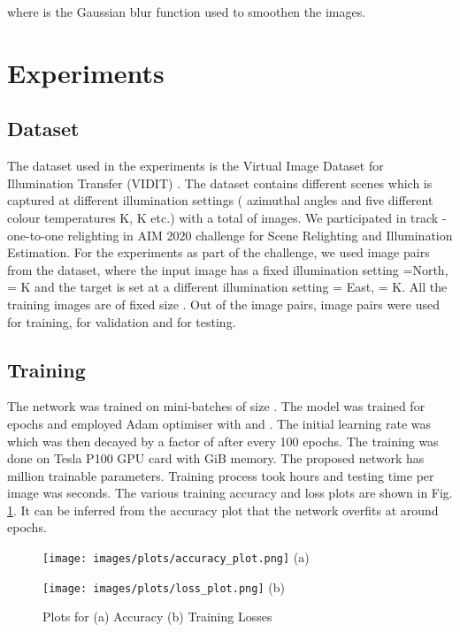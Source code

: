 \documentclass[runningheads]{llncs}
\begin{document}
where  is the Gaussian blur function used to smoothen the images.

\section{Experiments}
\label{section:experiments}
\subsection{Dataset}
The dataset used in the experiments is the Virtual Image Dataset for Illumination Transfer (VIDIT) \cite{vidit}. The dataset contains  different scenes which is captured at  different illumination settings ( azimuthal angles and five different colour temperatures K, K etc.) with a total of  images. We participated in track  - one-to-one relighting in AIM 2020 challenge for Scene Relighting and Illumination Estimation. For the experiments as part of the challenge, we used  image pairs from the dataset, where the input image has a fixed illumination setting =North,  = K and the target is set at a different illumination setting  = East,  = K. All the training images are of fixed size . 
Out of the  image pairs,  image pairs were used for training,  for validation and  for testing. 
\subsection{Training}
\par

The network was trained on mini-batches of size . The model was trained for  epochs and employed Adam optimiser with  and . The initial learning rate was  which was then decayed by a factor of  after every 100 epochs. The training was done on  Tesla P100 GPU card with  GiB memory. The proposed network has  million trainable parameters. Training process took  hours and testing time per image was  seconds. The various training accuracy and loss plots are shown in Fig. \ref{fig:plots}. It can be inferred from the accuracy plot that the network overfits at around  epochs.



\begin{figure}
\centering
\newcommand\x{0.49}
\newcommand\scale{0.34}
  \begin{minipage}{\x\linewidth}
		\begin{center}
		\texttt{[image: images/plots/accuracy\_plot.png]}
		\fontsize{8}{12pt}\selectfont (a)
		\end{center}
  \end{minipage}
  \begin{minipage}{\x\linewidth}
		\begin{center}
		\texttt{[image: images/plots/loss\_plot.png]}
		\fontsize{8}{12pt}\selectfont (b)
		\end{center}
  \end{minipage}
\caption{ Plots for (a) Accuracy  (b) Training Losses}
\label{fig:plots}
\end{figure}
\end{document}

